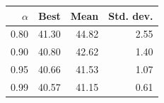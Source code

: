 \begin{tabular}{rrrr}
\toprule
$\alpha$ & Best & Mean & Std. dev. \\
\midrule
0.80 & 41.30 & 44.82 & 2.55 \\
0.90 & 40.80 & 42.62 & 1.40 \\
0.95 & 40.66 & 41.53 & 1.07 \\
0.99 & 40.57 & 41.15 & 0.61 \\
\bottomrule
\end{tabular}

